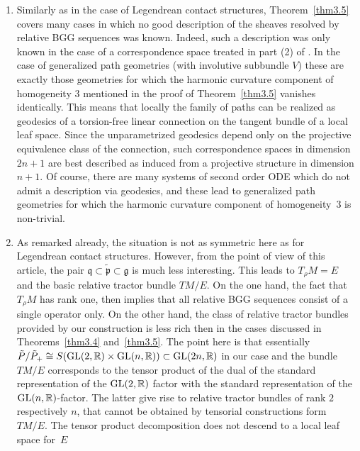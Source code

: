 \documentclass[pdftex]{sigma}
\numberwithin{equation}{section}
\def\frak{\mathfrak}
\def\Bbb{\mathbb}
\newcommand{\x}{\times}
\begin{document}
\begin{Remark}\label{rem3.5}\quad
\begin{enumerate}\itemsep=0pt
\item[(1)] Similarly as in the case of Legendrean contact structures, Theorem~\ref{thm3.5}
 covers many cases in which no good description of the sheaves resolved by relative
 BGG sequences was known. Indeed, such a description was only known in the case of a
 correspondence space treated in part (2) of \cite[Theorem 4.11]{Rel-BGG2}. In the
 case of generalized path geometries (with involutive subbundle $V$) these are
 exactly those geometries for which the harmonic curvature component of homogeneity
 $3$ mentioned in the proof of Theorem~\ref{thm3.5} vanishes identically. This means
 that locally the family of paths can be realized as geodesics of a torsion-free
 linear connection on the tangent bundle of a local leaf space. Since the
 unparametrized geodesics depend only on the projective equivalence class of the
 connection, such correspondence spaces in dimension $2n+1$ are best described as
 induced from a projective structure in dimension $n+1$. Of course, there are many
 systems of second order ODE which do not admit a description via geodesics, and
 these lead to generalized path geometries for which the harmonic curvature
 component of homogeneity~$3$ is non-trivial.
\item[(2)] As remarked already, the situation is not as symmetric here as for Legendrean
 contact structures. However, from the point of view of this article, the pair
 $\frak q\subset\tilde{\frak p}\subset\frak g$ is much less interesting. This leads
 to $T_\rho M=E$ and the basic relative tractor bundle $TM/E$. On the one hand, the
 fact that $T_\rho M$ has rank one, then implies that all relative BGG sequences
 consist of a single operator only. On the other hand, the class of relative tractor
 bundles provided by our construction is less rich then in the cases discussed in
 Theorems~\ref{thm3.4} and~\ref{thm3.5}. The point here is that essentially $\tilde
 P/\tilde P_+\cong S({\rm GL}(2,\Bbb R)\x {\rm GL}(n,\Bbb R))\subset {\rm GL}(2n,\Bbb R)$ in our case
 and the bundle $TM/E$ corresponds to the tensor product of the dual of the standard
 representation of the ${\rm GL}(2,\Bbb R)$ factor with the standard representation of the
 ${\rm GL}(n,\Bbb R)$-factor. The latter give rise to relative tractor bundles of rank $2$
 respectively $n$, that cannot be obtained by tensorial constructions form~$TM/E$.
 The tensor product decomposition does not descend to a local leaf space for~$E$

\end{enumerate}
\end{Remark}
\end{document}
